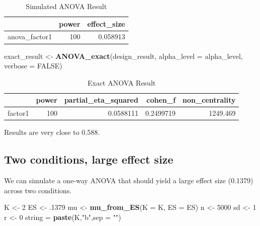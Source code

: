 \documentclass[
]{book}
\newenvironment{Shaded}{\begin{snugshade}}{\end{snugshade}}
\newcommand{\DataTypeTok}[1]{\textcolor[rgb]{0.13,0.29,0.53}{#1}}
\newcommand{\DecValTok}[1]{\textcolor[rgb]{0.00,0.00,0.81}{#1}}
\newcommand{\FloatTok}[1]{\textcolor[rgb]{0.00,0.00,0.81}{#1}}
\newcommand{\KeywordTok}[1]{\textcolor[rgb]{0.13,0.29,0.53}{\textbf{#1}}}
\newcommand{\NormalTok}[1]{#1}
\newcommand{\OtherTok}[1]{\textcolor[rgb]{0.56,0.35,0.01}{#1}}
\newcommand{\StringTok}[1]{\textcolor[rgb]{0.31,0.60,0.02}{#1}}
\begin{document}
\begin{table}[!h]

\caption{\label{tab:unnamed-chunk-56}Simulated ANOVA Result}
\centering
\begin{tabular}[t]{l|r|r}
\hline
  & power & effect\_size\\
\hline
anova\_factor1 & 100 & 0.058913\\
\hline
\end{tabular}
\end{table}

\begin{Shaded}
\begin{Highlighting}[]
\NormalTok{exact_result <-}\StringTok{ }\KeywordTok{ANOVA_exact}\NormalTok{(design_result,}
                            \DataTypeTok{alpha_level =}\NormalTok{ alpha_level,}
                            \DataTypeTok{verbose =} \OtherTok{FALSE}\NormalTok{)}
\end{Highlighting}
\end{Shaded}

\begin{table}[!h]

\caption{\label{tab:unnamed-chunk-58}Exact ANOVA Result}
\centering
\begin{tabular}[t]{l|r|r|r|r}
\hline
  & power & partial\_eta\_squared & cohen\_f & non\_centrality\\
\hline
factor1 & 100 & 0.0588111 & 0.2499719 & 1249.469\\
\hline
\end{tabular}
\end{table}

Results are very close to 0.588.

\hypertarget{two-conditions-large-effect-size}{%
\subsection{Two conditions, large effect size}\label{two-conditions-large-effect-size}}

We can simulate a one-way ANOVA that should yield a large effect size (0.1379) across two conditions.

\begin{Shaded}
\begin{Highlighting}[]
\NormalTok{K <-}\StringTok{ }\DecValTok{2}
\NormalTok{ES <-}\StringTok{ }\FloatTok{.1379}
\NormalTok{mu <-}\StringTok{ }\KeywordTok{mu_from_ES}\NormalTok{(}\DataTypeTok{K =}\NormalTok{ K, }\DataTypeTok{ES =}\NormalTok{ ES)}
\NormalTok{n <-}\StringTok{ }\DecValTok{5000}
\NormalTok{sd <-}\StringTok{ }\DecValTok{1}
\NormalTok{r <-}\StringTok{ }\DecValTok{0}
\NormalTok{string =}\StringTok{ }\KeywordTok{paste}\NormalTok{(K,}\StringTok{"b"}\NormalTok{,}\DataTypeTok{sep =} \StringTok{""}\NormalTok{)}
\end{Highlighting}
\end{Shaded}
\end{document}

